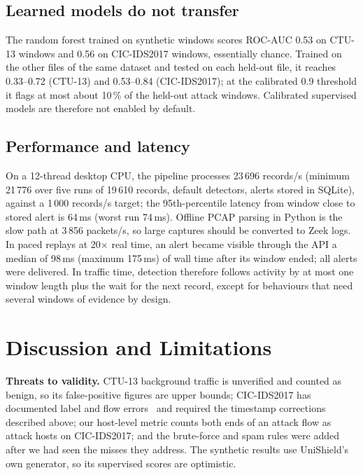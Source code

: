 \documentclass[conference]{IEEEtran}
\begin{document}
\subsection{Learned models do not transfer}
The random forest trained on synthetic windows scores ROC-AUC 0.53 on CTU-13 windows and 0.56 on CIC-IDS2017 windows, essentially chance. Trained on the other files of the same dataset and tested on each held-out file, it reaches 0.33--0.72 (CTU-13) and 0.53--0.84 (CIC-IDS2017); at the calibrated 0.9 threshold it flags at most about 10\,\% of the held-out attack windows. Calibrated supervised models are therefore not enabled by default.

\subsection{Performance and latency}
On a 12-thread desktop CPU, the pipeline processes 23\,696 records/s (minimum 21\,776 over five runs of 19\,610 records, default detectors, alerts stored in SQLite), against a 1\,000 records/s target; the 95th-percentile latency from window close to stored alert is 64\,ms (worst run 74\,ms). Offline PCAP parsing in Python is the slow path at 3\,856 packets/s, so large captures should be converted to Zeek logs. In paced replays at 20$\times$ real time, an alert became visible through the API a median of 98\,ms (maximum 175\,ms) of wall time after its window ended; all alerts were delivered. In traffic time, detection therefore follows activity by at most one window length plus the wait for the next record, except for behaviours that need several windows of evidence by design.

\section{Discussion and Limitations}
\textbf{Threats to validity.} CTU-13 background traffic is unverified and counted as benign, so its false-positive figures are upper bounds; CIC-IDS2017 has documented label and flow errors~\cite{engelen2021troubleshooting} and required the timestamp corrections described above; our host-level metric counts both ends of an attack flow as attack hosts on CIC-IDS2017; and the brute-force and spam rules were added after we had seen the misses they address. The synthetic results use UniShield's own generator, so its supervised scores are optimistic.
\end{document}
